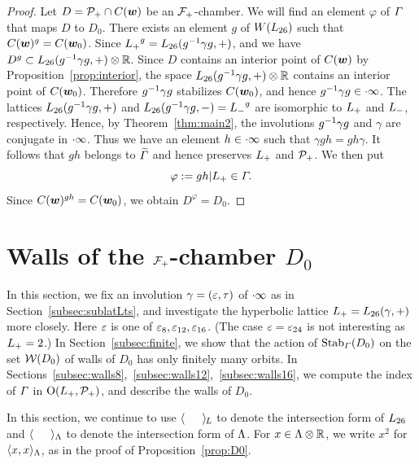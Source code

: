 \documentclass{amsart} %
\begin{document}
\begin{proof}
Let $D=\mathord{\mathcal{P}}_{+} \cap \mathord{C}(\boldsymbol{w})$ be an $\mathord{\mathcal{F}}_{+}$-chamber.
We will find an element $\varphi$ of $\varGamma$ 
that maps $D$ to $D_0$.
There exists an element $g$ of $W(L_{26})$
such that $\mathord{C}(\boldsymbol{w})^g=\mathord{C}(\boldsymbol{w}_0)$.
Since ${L_{+}}^g=L_{26}(g^{-1} \gamma g, +)$, 
and we have $D^g\subset L_{26}(g^{-1} \gamma g, +)\otimes \mathord{\mathbb{R}}$.
Since $D$ contains an interior point of $\mathord{C}(\boldsymbol{w})$ by 
Proposition~\ref{prop:interior},
the space $L_{26}(g^{-1} \gamma g, +)\otimes \mathord{\mathbb{R}}$ contains an interior point of $\mathord{C}(\boldsymbol{w}_0)$.
Therefore $g^{-1} \gamma g$ stabilizes $\mathord{C}(\boldsymbol{w}_0)$,
and hence $g^{-1} \gamma g \in \cdot \infty$.
The lattices $L_{26}(g^{-1} \gamma g, + )$ and $L_{26}(g^{-1} \gamma g, -)={L_{-}}^g$
are isomorphic to $L_{+}$ and $L_{-}$, respectively.
Hence, by Theorem~\ref{thm:main2},
the involutions $g^{-1} \gamma g$ and $\gamma$ are conjugate in $\cdot \infty$.
Thus we have an element $h\in \cdot \infty$
such that $\gamma g h =gh\gamma $.
It follows that $gh$ belongs to $\widetilde{\varGamma}$ and hence preserves $L_{+}$ and $\mathord{\mathcal{P}}_{+}$.
We then put
\[
\varphi:=gh|L_{+}\in \varGamma.
\]
Since $\mathord{C}(\boldsymbol{w})^{gh}=\mathord{C}(\boldsymbol{w}_0)$,
we obtain $D^\varphi=D_0$.
\end{proof}
%
%
%
\section{Walls of the $\mathord{\mathcal{F}}_{+}$-chamber $D_0$}\label{sec:wallsD0}
%
In this section, 
we fix an involution $\gamma=(\varepsilon, \tau)$ of $\cdot \infty$ as in Section~\ref{subsec:sublatLts},
 and  investigate the hyperbolic lattice $L_{+}=L_{26}(\gamma, +)$
 more closely.
 Here $\varepsilon$ is one of $\varepsilon_8, \varepsilon_{12}, \varepsilon_{16}$.
(The case $\varepsilon=\varepsilon_{24}$ is not interesting as $L_{+}=2$.)
In Section~\ref{subsec:finite},
we show that 
the action of $\operatorname{Stab}_{\varGamma}(D_0)$ on the set $\mathord{\mathcal{W}}(D_0)$ of 
walls of $D_0$ has only finitely many orbits.
In Sections~\ref{subsec:walls8},~\ref{subsec:walls12},~\ref{subsec:walls16}, 
we compute the index of $\varGamma$ in
$\mathord{\mathrm{O}}(L_{+}, \mathord{\mathcal{P}}_{+})$,
and describe the walls of $D_0$.
%
\par
In this section,
we continue to use
$\langle \phantom{a, a} \rangle_{\hskip -1pt L}$ to denote the intersection form of $L_{26}$
and $\langle \phantom{a, a} \rangle_{\Lambda}$ to denote the intersection form of $\Lambda$.
For $x\in \Lambda\otimes\mathord{\mathbb{R}}$, we write $x^2$ for $\langle x,x \rangle_{\Lambda}$,
as in the proof of Proposition~\ref{prop:D0}.
%
\end{document}
